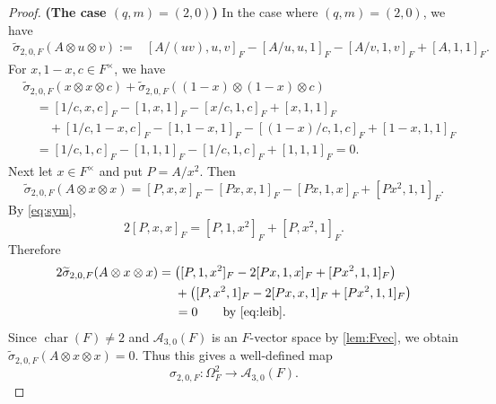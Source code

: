 \documentclass[a4paper,12pt,reqno]{amsart}
\numberwithin{equation}{section}
\theoremstyle{definition}
\newcommand{\Acal}{\mathcal{A}}
\begin{document}
\begin{proof}
\smallskip
\noindent
\textbf{(The case $(q,m)=(2,0)$)} 
In the case where $(q,m) = (2,0)$, we have 
\begin{align}\label{eq:s20-tilde}
 \widetilde \sigma_{2,0,F}(A\otimes u\otimes v)
 :={}&[A/(uv),u,v]_F-[A/u,u,1]_F
 -[A/v,1,v]_F+[A,1,1]_F.
\end{align}
For
$x,1-x,c\in F^\times$, we have
\begin{align*}
&\widetilde \sigma_{2,0,F}(x\otimes x\otimes c)
 +\widetilde \sigma_{2,0,F}((1-x)\otimes(1-x)\otimes c)\\
&\quad = [1/c,x,c]_F-[1,x,1]_F-[x/c,1,c]_F+[x,1,1]_F\\
&\quad\quad +[1/c,1-x,c]_F-[1,1-x,1]_F
 -[(1-x)/c,1,c]_F+[1-x,1,1]_F\\
&\quad =[1/c,1,c]_F-[1,1,1]_F-[1/c,1,c]_F+[1,1,1]_F=0.
\end{align*}
Next let $x\in F^\times$ and put $P=A/x^2$.  Then
\[
\widetilde \sigma_{2,0,F}(A\otimes x\otimes x)
 =[P,x,x]_F-[Px,x,1]_F-[Px,1,x]_F+[Px^2,1,1]_F.
\]
By \eqref{eq:sym},
\[
 2[P,x,x]_F=[P,1,x^2]_F+[P,x^2,1]_F.
\]
Therefore
\begin{align*}
2\widetilde \sigma_{2,0,F}(A\otimes x\otimes x)
={}&\bigl([P,1,x^2]_F-2[Px,1,x]_F+[Px^2,1,1]_F\bigr)\\
&+\bigl([P,x^2,1]_F-2[Px,x,1]_F+[Px^2,1,1]_F\bigr)\\
&=0 \qquad \mbox{by \eqref{eq:leib}}.
\end{align*}
Since
$\operatorname{char}(F)\neq2$ and $\Acal_{3,0}(F)$ is an $F$-vector space by
\autoref{lem:Fvec}, we obtain $\widetilde \sigma_{2,0,F}(A\otimes x\otimes x)=0$.  Thus this gives a
well-defined map
\[
 \sigma_{2,0,F}:\Omega_F^2\to\Acal_{3,0}(F).
\]


\end{proof}
\end{document}
